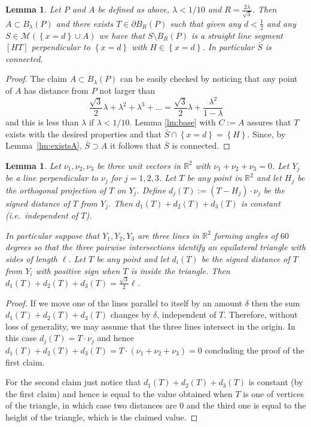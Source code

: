 \documentclass{amsart}
\newcommand{\RR}{\mathbb R}
\newcommand{\ENCLOSE}[1]{\left\{#1\right\}}
\newcommand{\M}{\mathcal{M}}
\newtheorem{lemma}[theorem]{Lemma}
\theoremstyle{definition}
\theoremstyle{remark}
\begin{document}
\begin{lemma}\label{lm:01}
  Let $P$ and $A$ be defined as above,
  $\lambda < 1/10$ and
  $R=\frac{2\lambda}{\sqrt 3}$.
  Then $A\subset B_\lambda(P)$ and 
  there exists $T\in \partial B_R(P)$ such that
  given any $d<\frac 1 2$ and any
  $S\in \M(\ENCLOSE{x=d}\cup A)$ 
  we have that $S\setminus B_R(P)$ is a straight line segment
  $[HT]$ perpendicular to $\ENCLOSE{x=d}$ 
  with $H\in \ENCLOSE{x=d}$.
  In particular $\bar S$ is connected.
\end{lemma}
\begin{proof}
  The claim $A\subset B_\lambda(P)$ can be easily checked
  by noticing that any point of $A$ has distance
  from $P$ not larger than 
  \[
      \frac{\sqrt 3}{2}\lambda + \lambda^2 + \lambda^3 + \dots
      = \frac{\sqrt 3}{2}\lambda + \frac{\lambda^2}{1-\lambda}
  \]
  and this is less than $\lambda$ if $\lambda < 1/10$.
  Lemma \ref{lm:base} with $C:=A$ assures that 
  $T$ exists with the desired properties and 
  that $\bar S\cap \ENCLOSE{x=d} =\ENCLOSE{H}$.
  Since, by Lemma~\ref{lm:existsA}, $\bar S \supset A$
  it follows that $\bar S$ is connected.
\end{proof}

\begin{lemma}\label{lm:tripod}
  Let $\nu_1,\nu_2,\nu_3$ be three unit vectors in $\RR^2$
  with $\nu_1+\nu_2+\nu_3=0$. 
  Let $Y_j$ be a line perpendicular to $\nu_j$ for $j=1,2,3$.
  Let $T$ be any point in $\RR^2$ and let $H_j$ be the orthogonal 
  projection of $T$ on $Y_j$.
  Define $d_j(T) := (T-H_j)\cdot \nu_j$
  be the signed distance of $T$ from $Y_j$.
  Then $d_1(T) + d_2(T) + d_3(T)$ is constant 
  (i.e.\ independent of $T$).

  In particular suppose that  
  $Y_1,Y_2,Y_3$ are three lines in $\RR^2$
  forming angles of $60$ degrees so that 
  the three pairwise intersections identify
  an equilateral triangle with sides of length $\ell$.
  Let $T$ be any point and let $d_i(T)$ be 
  the signed distance of $T$ from $Y_i$
  with positive sign when $T$ is inside the triangle.
  Then $d_1(T) + d_2(T) + d_3(T) = \frac{\sqrt 3}{2}\ell$.
\end{lemma}
\begin{proof}
  If we move one of the lines parallel to itself by an amount $\delta$ 
  then the sum $d_1(T)+d_2(T)+d_3(T)$ changes by $\delta$, independent 
  of $T$.
  Therefore, without loss of generality, we may assume that the three lines 
  intersect in the origin.
  In this case $d_j(T) = T\cdot \nu_j$ and hence 
  $d_1(T)+d_2(T)+d_3(T) = T\cdot (\nu_1+\nu_2+\nu_3) = 0$
  concluding the proof of the first claim.

  For the second claim just notice that $d_1(T)+d_2(T)+d_3(T)$
  is constant (by the first claim) and hence is equal to the value 
  obtained when $T$ is one of vertices of the triangle, in which case 
  two distances are $0$ and the third one is equal to the height of the
  triangle, which is the claimed value.
\end{proof}
\end{document}
